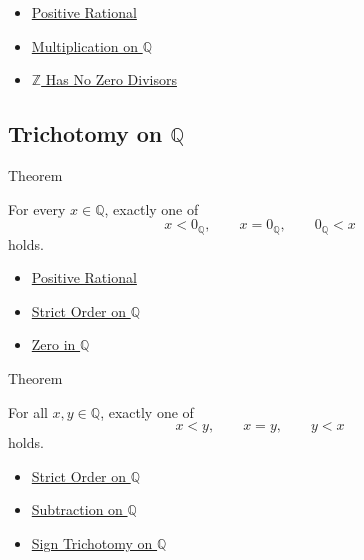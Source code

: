 \begin{dependencies}
\begin{itemize}
  \item \hyperref[def:positive-rational]{Positive Rational}
  \item \hyperref[def:multiplication-on-q-classes]{Multiplication on $\mathbb{Q}$}
  \item \hyperref[thm:z-has-no-zero-divisors]{$\mathbb{Z}$ Has No Zero Divisors}
\end{itemize}
\end{dependencies}

\subsection*{Trichotomy on $\mathbb{Q}$}

\begin{theorembox}{Theorem}
\begin{theorem}
\label{thm:sign-trichotomy-on-q}
For every $x\in\mathbb{Q}$, exactly one of
\[
x<0_{\mathbb{Q}},\qquad x=0_{\mathbb{Q}},\qquad 0_{\mathbb{Q}}<x
\]
holds.
\end{theorem}
\end{theorembox}

\begin{dependencies}
\begin{itemize}
  \item \hyperref[def:positive-rational]{Positive Rational}
  \item \hyperref[def:strict-order-on-q]{Strict Order on $\mathbb{Q}$}
  \item \hyperref[def:zero-in-q]{Zero in $\mathbb{Q}$}
\end{itemize}
\end{dependencies}

\begin{theorembox}{Theorem}
\begin{theorem}
\label{thm:trichotomy-on-q}
For all $x,y\in\mathbb{Q}$, exactly one of
\[
x<y,\qquad x=y,\qquad y<x
\]
holds.
\end{theorem}
\end{theorembox}

\begin{dependencies}
\begin{itemize}
  \item \hyperref[def:strict-order-on-q]{Strict Order on $\mathbb{Q}$}
  \item \hyperref[def:subtraction-on-q]{Subtraction on $\mathbb{Q}$}
  \item \hyperref[thm:sign-trichotomy-on-q]{Sign Trichotomy on $\mathbb{Q}$}
\end{itemize}
\end{dependencies}

